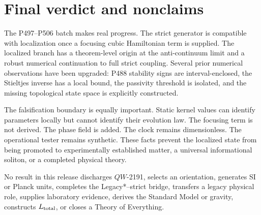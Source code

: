 \documentclass[11pt,a4paper]{article}
\theoremstyle{definition}
\theoremstyle{remark}
\begin{document}
\section{Final verdict and nonclaims}

The P497--P506 batch makes real progress. The strict generator is compatible with localization once a focusing cubic Hamiltonian term is supplied. The localized branch has a theorem-level origin at the anti-continuum limit and a robust numerical continuation to full strict coupling. Several prior numerical observations have been upgraded: P488 stability signs are interval-enclosed, the Stieltjes inverse has a local bound, the passivity threshold is isolated, and the missing topological state space is explicitly constructed.

The falsification boundary is equally important. Static kernel values can identify parameters locally but cannot identify their evolution law. The focusing term is not derived. The phase field is added. The clock remains dimensionless. The operational tester remains synthetic. These facts prevent the localized state from being promoted to experimentally established matter, a universal informational soliton, or a completed physical theory.

No result in this release discharges $QW$-2191, selects an orientation, generates SI or Planck units, completes the Legacy*--strict bridge, transfers a legacy physical role, supplies laboratory evidence, derives the Standard Model or gravity, constructs $L_{\rm total}$, or closes a Theory of Everything.
\end{document}

